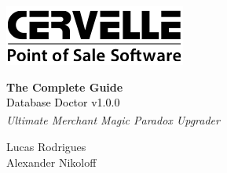 \documentclass[a4paper, 11pt]{article}
\begin{document}
 


\begin{titlepage} %

	\raggedleft %
	
	\vspace*{\baselineskip} %
	
	\includegraphics[scale=0.6]{cervelle} %
	
	\vspace*{0.2\textheight} %
	
	
	\textbf{\LARGE The Complete Guide}\\[\baselineskip] %
	
	{\textcolor{Black}{\Huge Database Doctor v1.0.0}}\\[\baselineskip] %
	
	{\Large \textit{Ultimate Merchant Magic\textsuperscript{\textregistered} Paradox Upgrader}} %
	
	\vfill %
	
	
	{\large Lucas Rodrigues}\\[\baselineskip]{\large Alexander Nikoloff}  %
	
	\vspace*{3\baselineskip} %

\end{titlepage}
\pagebreak
\end{document}
